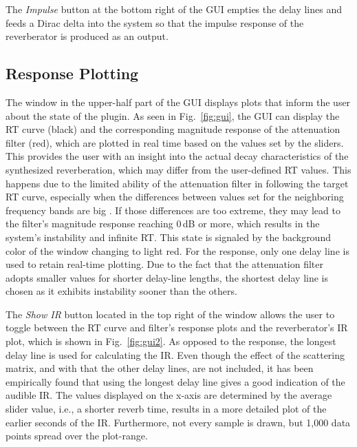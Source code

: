 \documentclass[twoside,a4paper]{article}
\begin{document}
The \textit{Impulse} button at the bottom right of the GUI empties the delay lines and feeds a Dirac delta into the system so that the impulse response of the reverberator is produced as an output.





\subsection{Response Plotting}
The window in the upper-half part of the GUI displays plots that inform the user about the state of the plugin. As seen in Fig.~\ref{fig:gui}, the GUI can display the RT curve (black) and the corresponding magnitude response of the attenuation filter (red), which are plotted in real time based on the values set by the sliders. This provides the user with an insight into the actual decay characteristics of the synthesized reverberation, which may differ from the user-defined RT values. This happens due to the limited ability of the attenuation filter in following the target RT curve, especially when the differences between values set for the neighboring frequency bands are big \cite{prawda:2019:improved}. If those differences are too extreme, they may lead to the filter's magnitude response reaching 0\,dB or more, which results in the system's instability and infinite RT. This state is signaled by the background color of the window changing to light red. For the response, only one delay line is used to retain real-time plotting. Due to the fact that the attenuation filter adopts smaller values for shorter delay-line lengths, the shortest delay line is chosen as it exhibits instability sooner than the others.  


The \textit{Show IR} button located in the top right of the window allows the user to toggle between the RT curve and filter's response plots and the reverberator's IR plot, which is shown in Fig.~\ref{fig:gui2}. As opposed to the response, the longest delay line is used for calculating the IR. Even though the effect of the scattering matrix, and with that the other delay lines, are not included, it has been empirically found that using the longest delay line gives a good indication of the audible IR. The values displayed on the x-axis are determined by the average slider value, i.e., a shorter reverb time, results in a more detailed plot of the earlier seconds of the IR. Furthermore, not every sample is drawn, but 1,000 data points spread over the plot-range.
\end{document}
